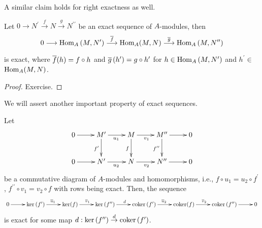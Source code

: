 A similar claim holds for right exactness as well.
\begin{proposition}\label{prop: right-exact-hom}
    Let $0 \longrightarrow N^{\prime} \stackrel{f}{\longrightarrow} N \stackrel{g}{\longrightarrow} N^{\prime \prime}$ be an exact sequence of $A$-modules, then
    $$
    0 \longrightarrow \operatorname{\text{Hom\/}}_{A}\left(M, N^{\prime}\right) \stackrel{\overline{f}}{\longrightarrow} \operatorname{\text{Hom\/}}_{A}(M, N) \stackrel{\overline{g}}{\longrightarrow} \operatorname{\text{Hom\/}}_{A}\left(M, N^{\prime \prime}\right)
    $$
    
    is exact, where $\overline{f}(h)=f \circ h$ and $\overline{g}\left(h^{\prime}\right)=g \circ h^{\prime}$ for $h \in \operatorname{\text{Hom\/}}_{A}\left(M, N^{\prime}\right)$ and $h^{\prime} \in$ $\operatorname{\text{Hom\/}}_{A}(M, N)$. 
\end{proposition}
\begin{proof}
    Exercise.
\end{proof}
We will assert another important property of exact sequences.
\begin{proposition}
    Let
    \[
    \xymatrix{
    0 \ar[r] & M' \ar[d]_{f'} \ar[r]_{u_1}& M\ar[d]_{f}  \ar[r]_{v_1}& M'' \ar[d]_{f''} \ar[r]& 0 \\
    0 \ar[r] & N' \ar[r]_{u_2}& N \ar[r]_{v_2}& N'' \ar[r]& 0
    }
    \]
    be a commutative diagram of $A$-modules and homomorphisms, i.e., $f \circ u_{1}=u_{2} \circ f^{\prime}$, $f^{\prime \prime} \circ v_{1}=v_{2} \circ f$ with rows being exact. Then, the sequence
    $$
    \xymatrix{
    0 \ar[r] & {\Ker} \left(f^{\prime}\right) \ar[r]^{\ol{u}_{1}}&{\Ker}(f) \ar[r]^{\ol{v}_{1}}& {\Ker}\left(f^{\prime \prime}\right) \ar[r]^{d}& {\Coker}\left(f^{\prime}\right) \ar[r]^{\ol{u}_{2}}& {\Coker}(f) \ar[r]^{\ol{v}_{2}}& {\Coker}\left(f^{\prime \prime}\right) \ar[r] & 0
    }
    $$
    is exact for some map $d: {\operatorname{\text{ker\/}}}\left(f^{\prime \prime}\right) \stackrel{d}{\rightarrow} {\operatorname{\text{coker\/}}}\left(f^{\prime}\right)$.
\end{proposition}
